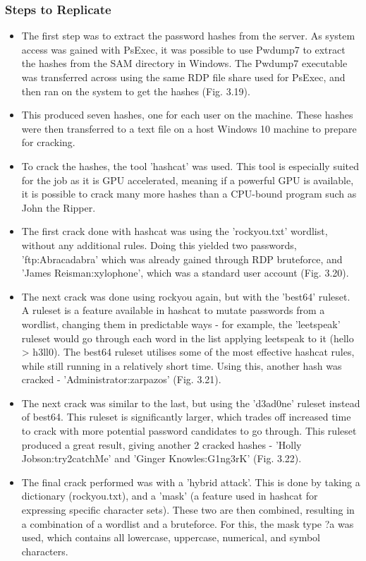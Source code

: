 \documentclass{report}
\begin{document}
\subsubsection{Steps to Replicate}
\begin{itemize}
	\item The first step was to extract the password hashes from the server. As system access was gained with PsExec, it was possible to use Pwdump7 to extract the hashes from the SAM directory in Windows. The Pwdump7 executable was transferred across using the same RDP file share used for PsExec, and then ran on the system to get the hashes (Fig. 3.19).
	\item This produced seven hashes, one for each user on the machine. These hashes were then transferred to a text file on a host Windows 10 machine to prepare for cracking.
	\item To crack the hashes, the tool 'hashcat' was used. This tool is especially suited for the job as it is GPU accelerated, meaning if a powerful GPU is available, it is possible to crack many more hashes than a CPU-bound program such as John the Ripper.
	\item The first crack done with hashcat was using the 'rockyou.txt' wordlist, without any additional rules. Doing this yielded two passwords, 'ftp:Abracadabra' which was already gained through RDP bruteforce, and 'James Reisman:xylophone', which was a standard user account (Fig. 3.20).
	\item The next crack was done using rockyou again, but with the 'best64' ruleset. A ruleset is a feature available in hashcat to mutate passwords from a wordlist, changing them in predictable ways - for example, the 'leetspeak' ruleset would go through each word in the list applying leetspeak to it (hello > h3ll0). The best64 ruleset utilises some of the most effective hashcat rules, while still running in a relatively short time. Using this, another hash was cracked - 'Administrator:zarpazos' (Fig. 3.21).
	\item The next crack was similar to the last, but using the 'd3ad0ne' ruleset instead of best64. This ruleset is significantly larger, which trades off increased time to crack with more potential password candidates to go through. This ruleset produced a great result, giving another 2 cracked hashes - 'Holly Jobson:try2catchMe' and 'Ginger Knowles:G1ng3rK' (Fig. 3.22).
	\item The final crack performed was with a 'hybrid attack'. This is done by taking a dictionary (rockyou.txt), and a 'mask' (a feature used in hashcat for expressing specific character sets). These two are then combined, resulting in a combination of a wordlist and a bruteforce. For this, the mask type ?a was used, which contains all lowercase, uppercase, numerical, and symbol characters.\\ 

\end{itemize}
\end{document}
